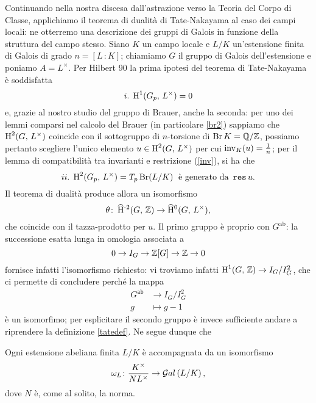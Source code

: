 Continuando nella nostra discesa dall'astrazione verso la Teoria del Corpo di Classe, applichiamo il teorema di dualità di Tate-Nakayama al caso dei campi locali: ne otterremo una descrizione dei gruppi di Galois in funzione della struttura del campo stesso. Siano $ K $ un campo locale e $ L / K  $ un'estensione finita di Galois di grado $ n = [L\,\colon K] $; chiamiamo $ G $ il gruppo di Galois dell'estensione e poniamo $ A = L^\times $. Per Hilbert 90 la prima ipotesi del teorema di Tate-Nakayama è soddisfatta 
\[ i. \; \operatorname{H}^1(G_p,\, L^\times) = 0 \]
e, grazie al nostro studio del gruppo di Brauer, anche la seconda: per uno dei lemmi comparsi nel calcolo del Brauer (in particolare \ref{br2}) sappiamo che $ \operatorname{H}^2(G, \, L^\times) $ coincide con il sottogruppo di $ n $-torsione di $ \operatorname{Br} K = \mathbb{Q}/\mathbb{Z} $, possiamo pertanto scegliere l'unico elemento $ u \in \operatorname{H}^2(G, \, L^\times) $ per cui $ \operatorname{inv}_K(u) = \frac{1}{n} $; per il lemma di compatibilità tra invarianti e restrizione (\ref{inv}), si ha che
\[ ii. \; \operatorname{H}^2(G_p, \, L^\times) = T_p \operatorname{Br}(L/K) \;\text{ è generato da } \operatorname{\mathtt{res}} u. \]
Il teorema di dualità produce allora un isomorfismo
\[ \theta\colon \operatorname{\widehat{H}^{-2}}(G, \, \mathbb{Z}) \to \operatorname{\widehat{H}^{0}}(G, \,  L^\times), \]
che coincide con il tazza-prodotto per $ u. $ Il primo gruppo è proprio con $ G^\text{ab} $: la successione esatta lunga in omologia associata a 
\[ 0 \to I_G \to \mathbb{Z}[G] \to \mathbb{Z} \to 0 \]
fornisce infatti l'isomorfismo richiesto: vi troviamo infatti $ \operatorname{H}^1(G, \, \mathbb{Z}) \to I_G/I_G^2 $, che ci permette di concludere perché la mappa
\begin{align*}
	G^\texttt{ab} &\to I_G/I_G^2 \\
	g& \mapsto g-1
\end{align*}
è un isomorfimo; per esplicitare il secondo gruppo è invece sufficiente andare a riprendere la definizione \eqref{tatedef}. Ne segue dunque che

\begin{theorem}
	Ogni estensione abeliana finita $ L/K $ è accompagnata da un isomorfismo
	\[ \omega_L\colon \frac{K^\times}{NL^\times} \to \mathcal{G}al\left( L/K \right), \]
	dove $ N $ è, come al solito, la norma.
\end{theorem}


